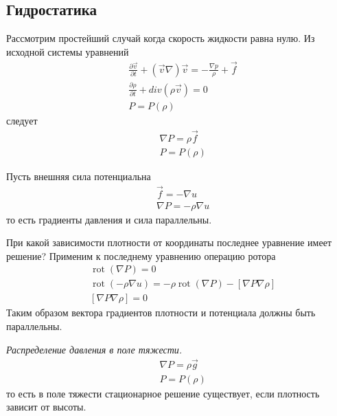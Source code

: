 \subsection{Гидростатика}
Рассмотрим простейший случай когда скорость жидкости равна нулю. Из исходной системы уравнений 
\begin{align*}
& \frac { \partial \vec { v } } { \partial t } + ( \vec { v } \nabla ) \vec { v } = - \frac { \nabla p } { \rho } + \vec { f } \\
& \frac { \partial \rho } { \partial t } + d i v ( \rho \vec { v } ) = 0 \\
& P = P ( \rho )
\end{align*}
следует
\begin{align*}
& \nabla P = \rho \vec { f } \\
& P = P ( \rho )
\end{align*}

Пусть внешняя сила потенциальна
\begin{align*}
& \vec { f } = - \nabla u \\
& \nabla P = - \rho \nabla u
\end{align*}
то есть градиенты давления и сила параллельны.

При какой зависимости плотности от координаты последнее уравнение имеет решение? Применим к последнему уравнению операцию ротора
\begin{align*}
& \operatorname { rot } ( \nabla P ) = 0 \\
& \operatorname { rot } ( - \rho \nabla u ) = - \rho \operatorname { rot } ( \nabla P ) - [ \nabla P \nabla \rho ] \\ 
& [ \nabla P \nabla \rho ] = 0
\end{align*}
Таким образом вектора градиентов плотности и потенциала должны быть параллельны.

\emph{Распределение давления в поле тяжести.}
\begin{align*}
& \nabla P = \rho \vec { g } \\
& P = P ( \rho )
\end{align*}
то есть в поле тяжести стационарное решение существует, если плотность зависит от высоты.

